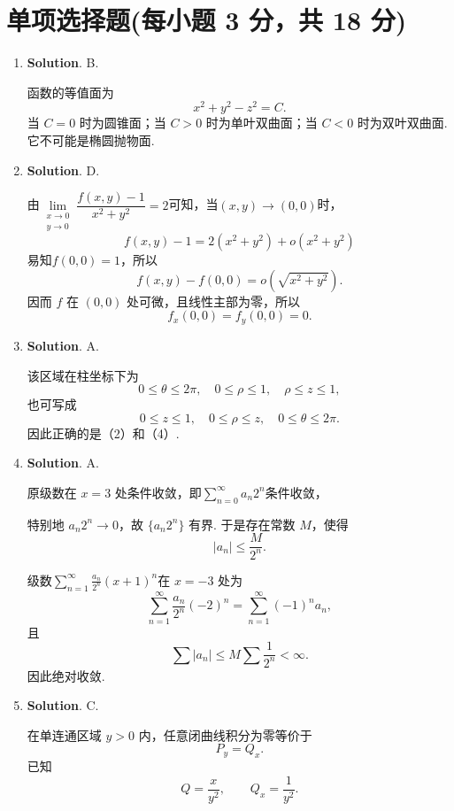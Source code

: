 \documentclass[../main.tex]{subfiles}
\begin{document}
\section{单项选择题(每小题 3 分，共 18 分)}
\begin{enumerate}
  \item \textbf{Solution}. B.

        函数的等值面为
        \[
          x^2+y^2-z^2=C.
        \]
        当 \(C=0\) 时为圆锥面；当 \(C>0\) 时为单叶双曲面；当 \(C<0\) 时为双叶双曲面. 它不可能是椭圆抛物面.

  \item \textbf{Solution}. D.

        由$\lim\limits_{\substack{x \to 0 \\ y \to 0}}\dfrac{f(x,y)-1}{x^2+y^2}=2$可知，当$(x,y)\to(0,0)$时，
        \[
          f(x,y)-1=2(x^2+y^2)+o(x^2+y^2)
        \]
        易知$f(0,0)=1$，所以
        \[
          f(x,y)-f(0,0)=o\left(\sqrt{x^2+y^2}\right).
        \]
        因而 \(f\) 在 \((0,0)\) 处可微，且线性主部为零，所以
        \[
          f_x(0,0)=f_y(0,0)=0.
        \]

  \item \textbf{Solution}. A.

        该区域在柱坐标下为
        \[
          0\le \theta\le 2\pi,\quad 0\le \rho\le 1,\quad \rho\le z\le 1,
        \]
        也可写成
        \[
          0\le z\le 1,\quad 0\le \rho\le z,\quad 0\le \theta\le 2\pi.
        \]
        因此正确的是（2）和（4）.

  \item \textbf{Solution}. A.

        原级数在 \(x=3\) 处条件收敛，即$\sum_{n=0}^{\infty}a_n2^n$条件收敛，

        特别地 \(a_n2^n\to0\)，故 \(\{a_n2^n\}\) 有界. 于是存在常数 \(M\)，使得
        \[
          |a_n|\le \frac{M}{2^n}.
        \]

        级数$\sum_{n=1}^{\infty}\frac{a_n}{2^n}(x+1)^n$在 \(x=-3\) 处为
        \[
          \sum_{n=1}^{\infty}\frac{a_n}{2^n}(-2)^n=\sum_{n=1}^{\infty}(-1)^n a_n,
        \]
        且
        \[
          \sum |a_n|\le M\sum\frac1{2^n}<\infty.
        \]
        因此绝对收敛.

  \item \textbf{Solution}. C.

        在单连通区域 \(y>0\) 内，任意闭曲线积分为零等价于
        \[
          P_y=Q_x.
        \]
        已知
        \[
          Q=\frac{x}{y^2},\qquad Q_x=\frac{1}{y^2}.
        \]


\end{enumerate}
\end{document}

